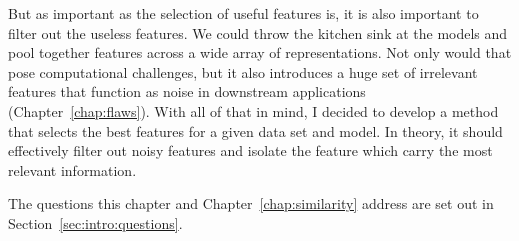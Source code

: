 But as important as the selection of useful features is, it is also important to filter out the useless features. We could throw the kitchen sink at the models and pool together features across a wide array of representations. Not only would that pose computational challenges, but it also introduces a huge set of irrelevant features that function as noise in downstream applications (Chapter~\ref{chap:flaws}). With all of that in mind, I decided to develop a method that selects the best features for a given data set and model. In theory, it should effectively filter out noisy features and isolate the feature which carry the most relevant information.

The questions this chapter and Chapter~\ref{chap:similarity} address are set out in Section~\ref{sec:intro:questions}.


